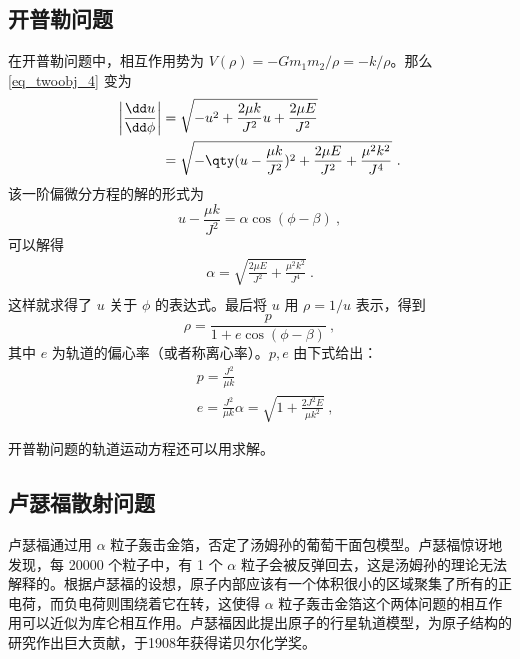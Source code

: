 \subsection{开普勒问题}
在开普勒问题中，相互作用势为 $V(\rho)=-Gm_1m_2/\rho=-k/\rho$。那么 \autoref{eq_twoobj_4} 变为
\begin{equation}
\begin{aligned}
\left|\frac{\dd u}{\dd \phi}\right|&=\sqrt{-u^2+\frac{2\mu k}{J^2}u+\frac{2\mu E}{J^2}}\\
&=\sqrt{-\qty(u-\frac{\mu k}{J^2})^2+\frac{2\mu E}{J^2}+\frac{\mu^2 k^2}{J^4}}~.
\end{aligned}
\end{equation}
该一阶偏微分方程的解的形式为
\begin{equation}
u-\frac{\mu k}{J^2}=\alpha\cos(\phi-\beta)~,
\end{equation}
可以解得
\begin{equation}
\begin{aligned}
\alpha=\sqrt{\frac{2\mu E}{J^2}+\frac{\mu^2 k^2}{J^4}}~.\\
\end{aligned}
\end{equation}
这样就求得了 $u$ 关于 $\phi$ 的表达式。最后将 $u$ 用 $\rho=1/u$ 表示，得到
\begin{equation}
\rho=\frac{p}{1+e\cos(\phi-\beta)}~,
\end{equation}
其中 $e$ 为轨道的偏心率（或者称离心率）。$p,e$ 由下式给出：
\begin{equation}
\begin{aligned}
&p=\frac{J^2}{\mu k}\\
&e=\frac{J^2}{\mu k}\alpha=\sqrt{1+\frac{2J^2E}{\mu k^2}}~,
\end{aligned}
\end{equation}

开普勒问题的轨道运动方程还可以用求解。

\subsection{卢瑟福散射问题}
卢瑟福通过用 $\alpha$ 粒子轰击金箔，否定了汤姆孙的葡萄干面包模型。卢瑟福惊讶地发现，每 20000 个粒子中，有 1 个 $\alpha$ 粒子会被反弹回去，这是汤姆孙的理论无法解释的。根据卢瑟福的设想，原子内部应该有一个体积很小的区域聚集了所有的正电荷，而负电荷则围绕着它在转，这使得 $\alpha$ 粒子轰击金箔这个两体问题的相互作用可以近似为库仑相互作用。卢瑟福因此提出原子的行星轨道模型，为原子结构的研究作出巨大贡献，于1908年获得诺贝尔化学奖。


